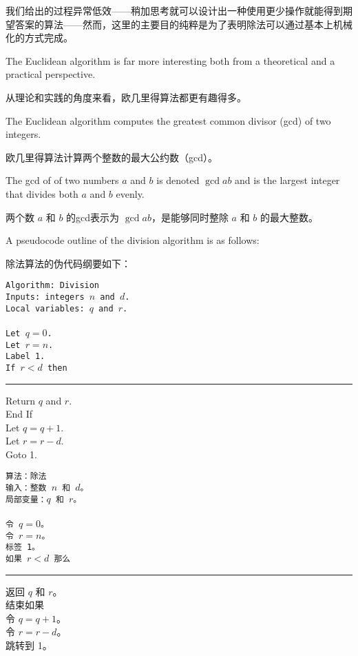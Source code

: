 我们给出的过程异常低效——稍加思考就可以设计出一种使用更少操作就能得到期望答案的算法——然而，这里的主要目的纯粹是为了表明除法可以通过基本上机械化的方式完成。

The Euclidean algorithm
is far more interesting both from a theoretical and a practical
perspective.

从理论和实践的角度来看，欧几里得算法都更有趣得多。

The Euclidean algorithm computes the greatest common
divisor (gcd) of two integers.

欧几里得算法计算两个整数的最大公约数（gcd）。

The gcd of of two numbers $a$ and $b$
is denoted $\gcd{a}{b}$ and is the largest integer that divides both
$a$ and $b$ evenly.

两个数 $a$ 和 $b$ 的gcd表示为 $\gcd{a}{b}$，是能够同时整除 $a$ 和 $b$ 的最大整数。

A pseudocode outline of the division algorithm is as follows:
\medskip

除法算法的伪代码纲要如下：
\medskip

\begin{center}
\begin{minipage}[b]{.5\textwidth}
\tt Algorithm: Division\\
Inputs: integers $n$ and $d$.\\
Local variables: $q$ and $r$.\\
\\
Let $q = 0$. \\
Let $r = n$. \\
Label 1.\\
If $r < d$ then\\
\rule{15pt}{0pt} Return $q$ and $r$.\\
End If\\
Let $q = q + 1$.\\
Let $r = r - d$.\\
Goto 1. \\
\end{minipage}
\end{center}

\begin{center}
\begin{minipage}[b]{.5\textwidth}
\tt 算法：除法\\
输入：整数 $n$ 和 $d$。\\
局部变量：$q$ 和 $r$。\\
\\
令 $q = 0$。\\
令 $r = n$。\\
标签 1。\\
如果 $r < d$ 那么\\
\rule{15pt}{0pt} 返回 $q$ 和 $r$。\\
结束如果\\
令 $q = q + 1$。\\
令 $r = r - d$。\\
跳转到 1。\\
\end{minipage}
\end{center}

